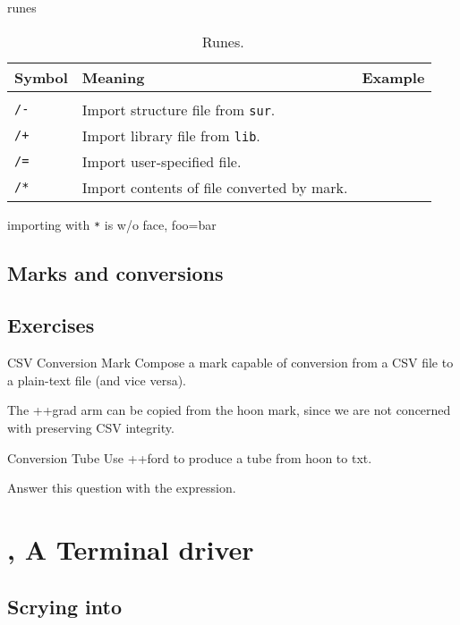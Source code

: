 runes

\begin{table}[h!]
  \begin{center}
    \caption{\ford~Runes.}
    \label{ha:ford}
    \begin{tabular}{lll}
      Symbol & Meaning & Example \\
      \hline \\
      \texttt{/-} & Import structure file from \texttt{sur}. & \\
      \texttt{/+} & Import library file from \texttt{lib}. & \\
      \texttt{/=} & Import user-specified file. & \\
      \texttt{/*} & Import contents of file converted by mark. & \\
    \end{tabular}
  \end{center}
\end{table}

importing with \texttt{*} is w/o face, foo=bar


\subsection[Marks]{Marks and conversions}

\subsection{Exercises}

CSV Conversion Mark
Compose a mark capable of conversion from a CSV file to a plain-text file (and vice versa).

The ++grad arm can be copied from the hoon mark, since we are not concerned with preserving CSV integrity.

Conversion Tube
Use ++ford to produce a tube from hoon to txt.

Answer this question with the expression.


\section[\dill]{\dill, A Terminal driver}

\subsection{Scrying into \dill}

